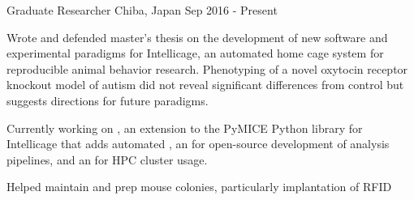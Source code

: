 %
%
%

\vspace*{0.35cm}

\begin{cventries}

    {Graduate Researcher}
    {Chiba, Japan}
    {Sep 2016 - Present}
    {\begin{cvitems}
        \item{
            {Wrote} and 
            {defended} master's thesis on the development of new software and
            experimental paradigms for Intellicage, an automated home cage system for
            reproducible animal behavior research. Phenotyping of a novel oxytocin
            receptor knockout model of autism did not reveal significant differences
            from control but suggests directions for future paradigms.\vspace*{0.1cm}}
        \item{Currently working on , an extension to the
            PyMICE Python library for Intellicage that adds automated , an
             for
            open-source development of analysis pipelines, and an  for HPC cluster
            usage.\vspace*{0.1cm}}
        \item{Helped maintain and prep mouse colonies, particularly implantation of RFID
}
\end{cvitems}}
\end{cventries}
